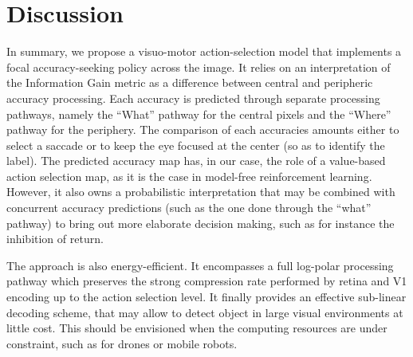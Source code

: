 \section{Discussion}
\label{sec:discussion}

In summary, we propose a visuo-motor action-selection model that implements a focal accuracy-seeking policy across the image. It relies on an interpretation of the Information Gain metric as a difference between central and peripheric accuracy processing.
Each accuracy is predicted through separate processing pathways, namely the ``What'' pathway for the central pixels and the ``Where'' pathway for the periphery. The comparison of each accuracies amounts either to select a saccade or to keep the eye focused at the center (so as to identify the label).
The predicted accuracy map has, in our case, the role of a value-based action selection map, as it is the case in model-free reinforcement learning. However, it also owns a probabilistic interpretation that may be combined with concurrent accuracy predictions (such as the one done through the ``what'' pathway) to bring out more elaborate decision making, such as for instance the inhibition of return. 




The approach is also energy-efficient. It encompasses a full log-polar processing pathway which preserves the strong compression rate performed by retina and V1 encoding up to the action selection level. It finally provides an effective sub-linear decoding scheme, that may allow to detect object in large visual environments at little cost. This should be envisioned when the computing resources are under constraint, such as for drones or mobile robots. 


